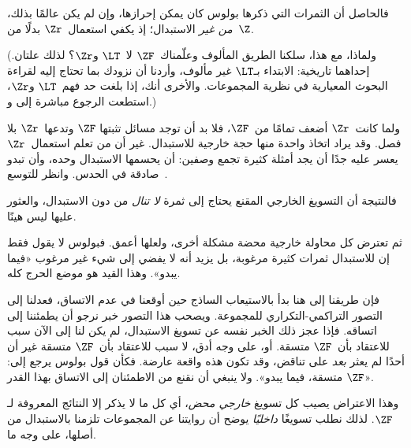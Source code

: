\documentclass[../../../include/open-logic-section]{subfiles}
\begin{document}
فالحاصل أن الثمرات التي ذكرها بولوس كان يمكن إحرازها، وإن لم يكن
عالمًا بذلك، \emph{من غير} الاستبدال؛ إذ يكفي استعمال~$\Zr$ بدلًا
من~$\Z$.

(ولماذا، مع هذا، سلكنا الطريق المألوف وعلّمناك~$\ZF$ لا~$\LT$ و$\Zr$؟
لذلك علتان. إحداهما تاريخية: الابتداء بـ$\LT$ غير مألوف، وأردنا أن
نزودك بما تحتاج إليه لقراءة البحوث المعيارية في نظرية المجموعات.
والأخرى أنك، إذا بلغت حد فهم~$\LT$ و$\Zr$، استطعت الرجوع مباشرة إلى
\citealt{Potter2004} و\citealt{ButtonLT1}.)

ولما كانت~$\Zr$ أضعف تمامًا من~$\ZF$، فلا بد أن توجد مسائل تثبتها
$\ZF$ وتدعها~$\Zr$ بلا فصل. وقد يراد اتخاذ واحدة منها حجة خارجية
للاستبدال. غير أن من تعلم استعمال~$\Zr$ يعسر عليه جدًا أن يجد أمثلة
كثيرة تجمع وصفين: أن يحسمها الاستبدال وحده، وأن تبدو صادقة في الحدس.
وانظر للتوسع~\citealt[\S13.2]{Potter2004}.

فالنتيجة أن التسويغ الخارجي المقنع يحتاج إلى ثمرة \emph{لا تنال}
من دون الاستبدال، والعثور عليها ليس هينًا.

ثم تعترض كل محاولة خارجية محضة مشكلة أخرى، ولعلها أعمق. فبولوس لا
يقول فقط إن للاستبدال ثمرات كثيرة مرغوبة، بل يزيد أنه لا يفضي إلى
شيء غير مرغوب «فيما يبدو». وهذا القيد هو موضع الحرج كله.

فإن طريقنا إلى هنا بدأ بالاستيعاب الساذج حين أوقعنا في عدم الاتساق،
فعدلنا إلى التصور التراكمي-التكراري للمجموعة. ويصحب هذا التصور خبر
نرجو أن يطمئننا إلى اتساقه. فإذا عجز ذلك الخبر نفسه عن تسويغ
الاستبدال، لم يكن لنا إلى الآن سبب للاعتقاد بأن~$\ZF$ متسقة. أو، على
وجه أدق، لا سبب للاعتقاد بأن~$\ZF$ متسقة غير أن أحدًا لم يعثر
\emph{بعد} على تناقض، وقد تكون هذه واقعة عارضة. فكأن قول بولوس يرجع
إلى: «$\ZF$ متسقة، فيما يبدو». ولا ينبغي أن نقنع من الاطمئنان إلى
الاتساق بهذا القدر.

وهذا الاعتراض يصيب كل تسويغ \emph{خارجي محض}، أي كل ما لا يذكر
إلا النتائج المعروفة لـ$\ZF$. لذلك نطلب تسويغًا \emph{داخليًا}
يوضح أن روايتنا عن المجموعات تلزمنا بالاستبدال من أصلها، على وجه ما.
\end{document}
